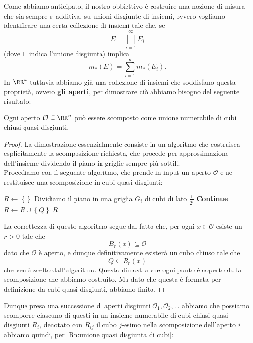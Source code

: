 \documentclass[11pt]{scrartcl}
\begin{document}
	Come abbiamo anticipato, il nostro obbiettivo è costruire una nozione di misura che sia sempre $\sigma$-additiva, su unioni disgiunte di insiemi, ovvero vogliamo identificare una certa collezione di insiemi tale che, se
	$$E=\bigsqcup_{i=1}^\infty E_i$$
	(dove $\sqcup$ indica l'unione disgiunta) implica
	$$m_*(E)=\sum_{i=1}^{\infty}m_*(E_i).$$
	In $\RR^n$ tuttavia abbiamo già una collezione di insiemi che soddisfano questa proprietà, ovvero \textbf{gli aperti}, per dimostrare ciò abbiamo bisogno del seguente risultato:
	\begin{lemma}\label{Rn:scomponibilità degli aperti}
		Ogni aperto $\mathcal{O}\subseteq \RR^n$ può essere scomposto come unione numerabile di cubi chiusi quasi disgiunti.
	\end{lemma}
	\begin{proof}
		La dimostrazione essenzialmente consiste in un algoritmo che costruisca esplicitamente la scomposizione richiesta, che procede per approssimazione dell'insieme dividendo il piano in griglie sempre più sottili. \\
		Procediamo con il seguente algoritmo, che prende in input un aperto $\mathcal{O}$ e ne restituisce una scomposizione in cubi quasi disgiunti: 
		\begin{algorithmic}
			\State $R \gets\left\{\right\}$  
				\State Dividiamo il piano in una griglia $G_i$ di cubi di lato $\frac{1}{2^i}$
						\State \textbf{Continue}
					\EndIf
						\State $R\gets R\cup \left\{Q\right\}$
					\EndIf
				\EndFor
			\EndFor
			\State \Return $R$
			\EndFunction
		\end{algorithmic}
		La correttezza di questo algoritmo segue dal fatto che, per ogni $x\in \mathcal{O}$ esiste un $r>0$ tale che 
		$$B_r(x)\subseteq \mathcal{O}$$
		dato che $\mathcal{O}$ è aperto, e dunque definitivamente esisterà un cubo chiuso tale che 
		$$Q\subseteq B_r(x)$$
		che verrà scelto dall'algoritmo. Questo dimostra che ogni punto è coperto dalla scomposizione che abbiamo costruito. Ma dato che questa è formata per definizione da cubi quasi disgiunti, abbiamo finito.
	\end{proof}
	Dunque presa una successione di aperti disgiunti $\mathcal{O}_1,\mathcal{O}_2,\dots$ abbiamo che possiamo scomporre ciascuno di questi in un insieme numerabile di cubi chiusi quasi disgiunti $R_i$, denotato con $R_{ij}$ il cubo $j$-esimo nella scomposizione dell'aperto $i$ abbiamo quindi, per \ref{Rn:unione quasi disgiunta di cubi}:
\end{document}
